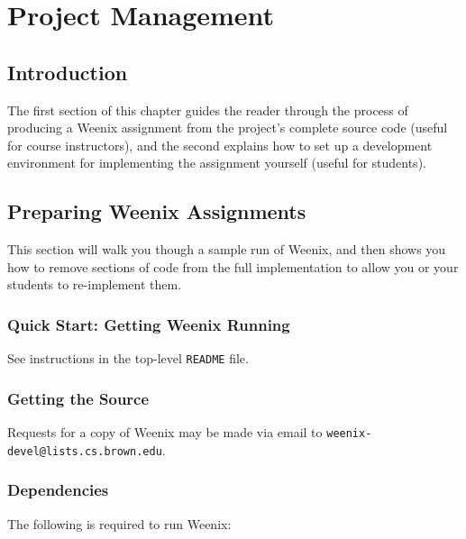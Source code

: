 \chapter{Project Management}
\label{project-management}

\section{Introduction}

The first section of this chapter guides the reader through the process of producing a Weenix assignment from the project's complete source code (useful for course instructors), and the second explains how to set up a development environment for implementing the assignment yourself (useful for students).

\section{Preparing Weenix Assignments}

This section will walk you though a sample run of Weenix, and then shows you how to remove sections of code from the full implementation to allow you or your students to re-implement them.

\subsection{Quick Start: Getting Weenix Running} \label{quickstart}

See instructions in the top-level \texttt{README} file.


\subsection{Getting the Source}
Requests for a copy of Weenix may be made via email to \texttt{weenix-devel@lists.cs.brown.edu}.
\subsection{Dependencies}
The following is required to run Weenix:

